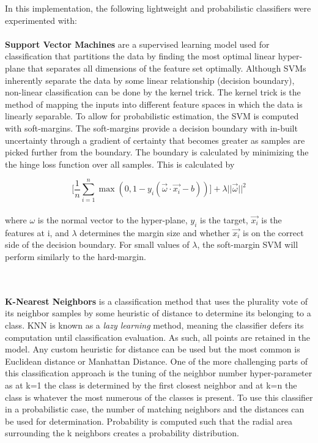 In this implementation, the following lightweight and probabilistic classifiers were experimented with:
\\
\\
\textbf{Support Vector Machines} are a supervised learning model used for classification that partitions the data by finding the most optimal linear hyper-plane that separates all dimensions of the feature set optimally. Although SVMs inherently separate the data by some linear relationship (decision boundary), non-linear classification can be done by the kernel trick. The kernel trick is the method of mapping the inputs into different feature spaces in which the data is linearly separable. To allow for probabilistic estimation, the SVM is computed with soft-margins. The soft-margins provide a decision boundary with in-built uncertainty through a gradient of certainty that becomes greater as samples are picked further from the boundary. The boundary is calculated by minimizing the the hinge loss function over all samples. This is calculated by

\begin{equation}
    \Big[ \frac{1}{n}\sum^n_{i=1}\max(0,1-y_i(\vec{\omega} \cdot \vec{x_i} - b))\Big] + \lambda ||\vec{\omega}||^2
\end{equation}
\\
where $\omega$ is the normal vector to the hyper-plane, $y_i$ is the target, $\vec{x_i}$ is the features at i, and $\lambda$ determines the margin size and whether $\vec{x_i}$ is on the correct side of the decision boundary. For small values of $\lambda$, the soft-margin SVM will perform similarly to the hard-margin.

\\
\\
\textbf{K-Nearest Neighbors} is a classification method that uses the plurality vote of its neighbor samples by some heuristic of distance to determine its belonging to a class. KNN is known as a \textit{lazy learning} method, meaning the classifier defers its computation until classification evaluation. As such, all points are retained in the model. Any custom heuristic for distance can be used but the most common is Euclidean distance or Manhattan Distance. One of the more challenging parts of this classification approach is the tuning of the neighbor number hyper-parameter as at k=1 the class is determined by the first closest neighbor and at k=n the class is whatever the most numerous of the classes is present. To use this classifier in a probabilistic case, the number of matching neighbors and the distances can be used for determination. Probability is computed such that the radial area surrounding the k neighbors creates a probability distribution. \cite{cheng_evaluating_2009}


